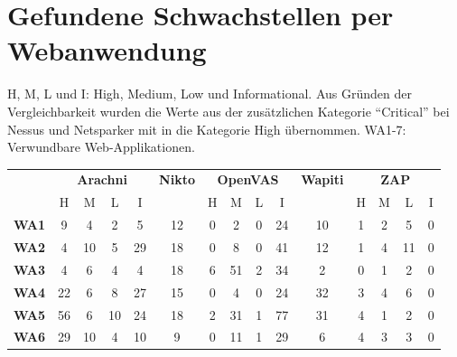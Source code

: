 \documentclass[12pt,oneside,a4paper,parskip,pointlessnumbers]{scrbook}
\begin{document}
  \section{Gefundene Schwachstellen per Webanwendung}
   H, M, L und I: High, Medium, Low und Informational. Aus Gründen der Vergleichbarkeit wurden die Werte aus der zusätzlichen Kategorie ``Critical'' bei Nessus und Netsparker mit in die Kategorie High übernommen. WA1-7: Verwundbare Web-Applikationen.
    \begin{table}[H]
      \begin{tabular}{|r|c|c|c|c|c|c|c|c|c|c|c|c|c|c|}
        \cline{2-15}
        \multicolumn{1}{r|}{}       & \multicolumn{4}{c|}{\textbf{Arachni}} & \textbf{Nikto} & \multicolumn{4}{c|}{\textbf{OpenVAS}} & \textbf{Wapiti} & \multicolumn{4}{c|}{\textbf{ZAP}}  \\
        \cline{2-15}
        \multicolumn{1}{r|}{}       & H & M & L & I              &                & H & M & L & I              &                 & H & M & L & I                        \\
        \hline
        \textbf{WA1}      & 9    & 4    & 2   & 5                 & 12             & 0    & 2    & 0   & 24                & 10              & 1    & 2    & 5   & 0                           \\
        \hline
        \textbf{WA2}        & 4    & 10   & 5   & 29                & 18             & 0    & 8    & 0   & 41                & 12              & 1    & 4    & 11  & 0                           \\
        \hline
        \textbf{WA3}          & 4    & 6    & 4   & 4                 & 18             & 6    & 51   & 2   & 34                & 2               & 0    & 1    & 2   & 0                           \\
        \hline
        \textbf{WA4}    & 22   & 6    & 8   & 27                & 15             & 0    & 4    & 0   & 24                & 32              & 3    & 4    & 6   & 0                           \\
        \hline
        \textbf{WA5}             & 56   & 6    & 10  & 24                & 18             & 2    & 31   & 1   & 77                & 31              & 4    & 1    & 2   & 0                           \\
        \hline
        \textbf{WA6}      & 29   & 10   & 4   & 10                & 9              & 0    & 11   & 1   & 29                & 6               & 4    & 3    & 3   & 0                           \\

\end{tabular}
\end{table}
\end{document}
